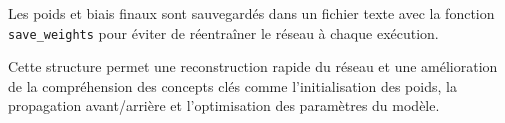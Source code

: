 Les poids et biais finaux sont sauvegardés dans un fichier texte avec la fonction \texttt{save\_weights} pour éviter de réentraîner le réseau à chaque exécution.

Cette structure permet une reconstruction rapide du réseau et une amélioration de la compréhension des concepts clés comme l'initialisation des poids, la propagation avant/arrière et l'optimisation des paramètres du modèle.

